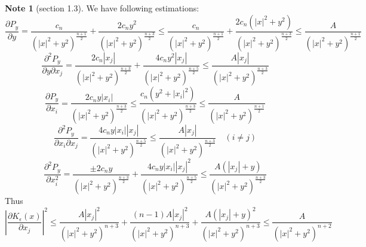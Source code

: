 \documentclass{report}
\theoremstyle{definition}
\newtheorem{note}{Note}
\theoremstyle{definition}
\theoremstyle{plain}
\numberwithin{theorem}{section}
\numberwithin{remark}{section}
\numberwithin{equation}{section}
\newcommand{\abs}[1]{\left\lvert#1\right\rvert}
\begin{document}
\begin{note}[section 1.3]
    We have following estimations:
    \begin{equation*}
        \frac{\partial P_y}{\partial y}=\frac{c_n}{(\abs{x}^2+y^2)^{\frac{n+1}{2}}}+\frac{2c_ny^2}{(\abs{x}^2+y^2)^{\frac{n+3}{2}}}\leq \frac{c_n}{(\abs{x}^2+y^2)^{\frac{n+1}{2}}}+\frac{2c_n(\abs{x}^2+y^2)}{(\abs{x}^2+y^2)^{\frac{n+3}{2}}}\leq \frac{A}{(\abs{x}^2+y^2)^{\frac{n+1}{2}}}
    \end{equation*}
    \begin{equation*}
        \frac{\partial^2 P_y}{\partial y\partial x_j}=\frac{2c_n\abs{x_j}}{(\abs{x}^2+y^2)^{\frac{n+3}{2}}}+\frac{4c_ny^2\abs{x_j}}{(\abs{x}^2+y^2)^{\frac{n+5}{2}}}\leq \frac{A\abs{x_j}}{(\abs{x}^2+y^2)^{\frac{n+3}{2}}}
    \end{equation*}
    \begin{equation*}
        \frac{\partial P_y}{\partial x_i}=\frac{2c_ny\abs{x_i}}{(\abs{x}^2+y^2)^{\frac{n+3}{2}}} \leq \frac{c_n(y^2+\abs{x_i}^2)}{(\abs{x}^2+y^2)^{\frac{n+3}{2}}} \leq\frac{A}{(\abs{x}^2+y^2)^{\frac{n+1}{2}}}
    \end{equation*}
    \begin{equation*}
        \frac{\partial^2 P_y}{\partial x_i\partial x_j}=\frac{4c_ny\abs{x_i}\abs{x_j}}{(\abs{x}^2+y^2)^{\frac{n+5}{2}}} \leq\frac{A\abs{x_j}}{(\abs{x}^2+y^2)^{\frac{n+3}{2}}}\quad (i\neq j)
    \end{equation*}
    \begin{equation*}
        \frac{\partial^2 P_y}{\partial x_i^2}=\frac{\pm 2c_ny}{(\abs{x}^2+y^2)^{\frac{n+3}{2}}}+\frac{4c_ny\abs{x_i}\abs{x_j}^2}{(\abs{x}^2+y^2)^{\frac{n+5}{2}}} \leq\frac{A(\abs{x_j}+y)}{(\abs{x}^2+y^2)^{\frac{n+3}{2}}}
    \end{equation*}
    Thus
    \begin{equation*}
        \abs{\frac{\partial K_{\epsilon}(x)}{\partial x_j}}^2\leq \frac{A\abs{x_j}^2}{(\abs{x}^2+y^2)^{{n+3}}}+\frac{(n-1)A\abs{x_j}^2}{(\abs{x}^2+y^2)^{{n+3}}}+\frac{A(\abs{x_j}+y)^2}{(\abs{x}^2+y^2)^{{n+3}}}\leq \frac{A}{(\abs{x}^2+y^2)^{{n+2}}}
    \end{equation*}
\end{note}
\end{document}
